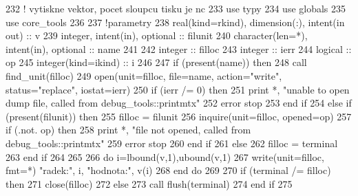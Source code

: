 \begin{DoxyCode}
232     \textcolor{comment}{! vytiskne vektor, pocet sloupcu tisku je nc}
233       \textcolor{keywordtype}{use }typy
234       \textcolor{keywordtype}{use }globals
235       \textcolor{keywordtype}{use }core_tools
236       
237       \textcolor{comment}{!parametry}
238       \textcolor{keywordtype}{real(kind=rkind)}, \textcolor{keywordtype}{dimension(:)}, \textcolor{keywordtype}{intent(in out)} :: v
239       \textcolor{keywordtype}{integer}, \textcolor{keywordtype}{intent(in)}, \textcolor{keywordtype}{optional} :: filunit   
240       \textcolor{keywordtype}{character(len=*)}, \textcolor{keywordtype}{intent(in)}, \textcolor{keywordtype}{optional} :: name
241 
242       \textcolor{keywordtype}{integer} :: filloc
243       \textcolor{keywordtype}{integer} :: ierr
244       \textcolor{keywordtype}{logical} :: op
245       \textcolor{keywordtype}{integer(kind=ikind)} :: i
246       
247       \textcolor{keywordflow}{if} (\textcolor{keyword}{present}(name)) \textcolor{keywordflow}{then}
248         \textcolor{keyword}{call }find_unit(filloc)
249         \textcolor{keyword}{open}(unit=filloc, file=name, action=\textcolor{stringliteral}{"write"}, status=\textcolor{stringliteral}{"replace"}, iostat=ierr)
250         \textcolor{keywordflow}{if} (ierr /= 0) \textcolor{keywordflow}{then}
251           print *, \textcolor{stringliteral}{"unable to open dump file, called from debug\_tools::printmtx"}
252           error stop
253 \textcolor{keywordflow}{        end if}
254       \textcolor{keywordflow}{else} \textcolor{keywordflow}{if} (\textcolor{keyword}{present}(filunit)) \textcolor{keywordflow}{then}
255         filloc = filunit
256         \textcolor{keyword}{inquire}(unit=filloc, opened=op)
257         \textcolor{keywordflow}{if} (.not. op) \textcolor{keywordflow}{then}
258           print *, \textcolor{stringliteral}{"file not opened, called from debug\_tools::printmtx"}
259           error stop
260 \textcolor{keywordflow}{        end if}
261       \textcolor{keywordflow}{else}
262         filloc = terminal
263 \textcolor{keywordflow}{      end if}
264      
265 
266       \textcolor{keywordflow}{do} i=lbound(v,1),ubound(v,1)
267          \textcolor{keyword}{write}(unit=filloc, fmt=*) \textcolor{stringliteral}{"radek:"}, i, \textcolor{stringliteral}{"hodnota:"}, v(i)
268 \textcolor{keywordflow}{      end do}
269 
270       \textcolor{keywordflow}{if} (terminal /= filloc) \textcolor{keywordflow}{then}
271         \textcolor{keyword}{close}(filloc)
272       \textcolor{keywordflow}{else}
273         \textcolor{keyword}{call }flush(terminal)
274 \textcolor{keywordflow}{      end if}
275   
\end{DoxyCode}


